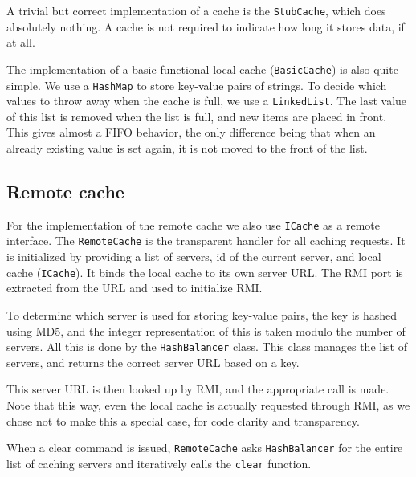 \documentclass[11pt]{article}
\begin{document}
A trivial but correct implementation of a cache is the \texttt{StubCache}, which does absolutely nothing. A cache is not required to indicate how long it stores data, if at all.

The implementation of a basic functional local cache (\texttt{BasicCache}) is also quite simple. We use a \texttt{HashMap} to store key-value pairs of strings. To decide which values to throw away when the cache is full, we use a \texttt{LinkedList}. The last value of this list is removed when the list is full, and new items are placed in front. This gives almost a FIFO behavior, the only difference being that when an already existing value is set again, it is not moved to the front of the list.

\subsection*{Remote cache}
For the implementation of the remote cache we also use \texttt{ICache} as a remote interface. The \texttt{RemoteCache} is the transparent handler for all caching requests. It is initialized by providing a list of servers, id of the current server, and local cache (\texttt{ICache}). It binds the local cache to its own server URL. The RMI port is extracted from the URL and used to initialize RMI.

To determine which server is used for storing key-value pairs, the key is hashed using MD5, and the integer representation of this is taken modulo the number of servers. All this is done by the \texttt{HashBalancer} class. This class manages the list of servers, and returns the correct server URL based on a key.

This server URL is then looked up by RMI, and the appropriate call is made. Note that this way, even the local cache is actually requested through RMI, as we chose not to make this a special case, for code clarity and transparency.

When a clear command is issued, \texttt{RemoteCache} asks \texttt{HashBalancer} for the entire list of caching servers and iteratively calls the \texttt{clear} function.
\end{document}
